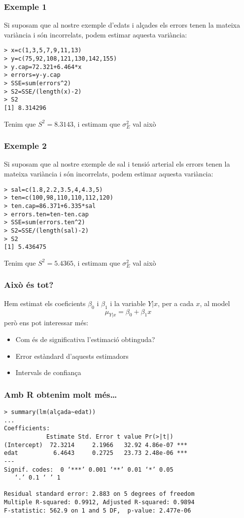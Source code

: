 \documentclass[12pt,t]{beamer}
\theoremstyle{plain}
\theoremstyle{definition}
\begin{document}
\begin{frame}[fragile]
\frametitle{Exemple 1}
Si suposam que al nostre exemple d'edats i alçades els errors tenen la mateixa variància i són incorrelats, podem estimar aquesta variància:
\begin{verbatim}
> x=c(1,3,5,7,9,11,13)
> y=c(75,92,108,121,130,142,155)
> y.cap=72.321+6.464*x
> errors=y-y.cap
> SSE=sum(errors^2)
> S2=SSE/(length(x)-2)
> S2
[1] 8.314296
\end{verbatim}
Tenim que $S^2=8.3143$, i estimam que $\sigma_E^2$ val això
\end{frame}

\begin{frame}[fragile]
\frametitle{Exemple 2}
Si suposam que al nostre exemple de sal i tensió arterial els errors  tenen la mateixa variància i són incorrelats, podem estimar aquesta variància:
\begin{verbatim}
> sal=c(1.8,2.2,3.5,4,4.3,5)
> ten=c(100,98,110,110,112,120)
> ten.cap=86.371+6.335*sal
> errors.ten=ten-ten.cap
> SSE=sum(errors.ten^2)
> S2=SSE/(length(sal)-2)
> S2
[1] 5.436475
\end{verbatim}
Tenim que $S^2=5.4365$, i estimam que $\sigma_E^2$ val això
\end{frame}





\begin{frame}
\frametitle{Això és tot?}
Hem estimat els coeficients $\beta_0$ i $\beta_1$ i la variable $Y|x$, per a cada $x$,  al model
$$
\mu_{Y|x}=\beta_0+\beta_1 x
$$
però ens pot interessar més:
\medskip

\begin{itemize}
\item Com és de significativa l'estimació obtinguda?
\medskip

\item Error estàndard d'aquests estimadors
\medskip

\item Intervals de confiança 
\end{itemize}
\end{frame}




\begin{frame}[fragile]
\frametitle{Amb R obtenim molt més\ldots}
\footnotesize \begin{verbatim}
> summary(lm(alçada~edat))
...
Coefficients:
            Estimate Std. Error t value Pr(>|t|)    
(Intercept)  72.3214     2.1966   32.92 4.86e-07 ***
edat          6.4643     0.2725   23.73 2.48e-06 ***
---
Signif. codes:  0 ‘***’ 0.001 ‘**’ 0.01 ‘*’ 0.05
   ‘.’ 0.1 ‘ ’ 1 

Residual standard error: 2.883 on 5 degrees of freedom
Multiple R-squared: 0.9912,	Adjusted R-squared: 0.9894 
F-statistic: 562.9 on 1 and 5 DF,  p-value: 2.477e-06 
\end{verbatim}
\end{frame}
\end{document}
